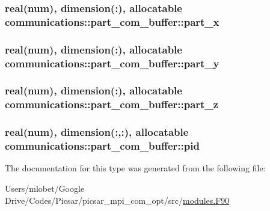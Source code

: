 \subsubsection[{\texorpdfstring{part\+\_\+x}{part_x}}]{\setlength{\rightskip}{0pt plus 5cm}real(num), dimension(\+:), allocatable communications\+::part\+\_\+com\+\_\+buffer\+::part\+\_\+x}\hypertarget{structcommunications_1_1part__com__buffer_a801190722c7c8ca2c90a9e743ea49df3}{}\label{structcommunications_1_1part__com__buffer_a801190722c7c8ca2c90a9e743ea49df3}
\subsubsection[{\texorpdfstring{part\+\_\+y}{part_y}}]{\setlength{\rightskip}{0pt plus 5cm}real(num), dimension(\+:), allocatable communications\+::part\+\_\+com\+\_\+buffer\+::part\+\_\+y}\hypertarget{structcommunications_1_1part__com__buffer_a5cd819e9ef8a6538446d32965392d7f2}{}\label{structcommunications_1_1part__com__buffer_a5cd819e9ef8a6538446d32965392d7f2}
\subsubsection[{\texorpdfstring{part\+\_\+z}{part_z}}]{\setlength{\rightskip}{0pt plus 5cm}real(num), dimension(\+:), allocatable communications\+::part\+\_\+com\+\_\+buffer\+::part\+\_\+z}\hypertarget{structcommunications_1_1part__com__buffer_aba5857af31512603eecebf3aa0203ea6}{}\label{structcommunications_1_1part__com__buffer_aba5857af31512603eecebf3aa0203ea6}
\subsubsection[{\texorpdfstring{pid}{pid}}]{\setlength{\rightskip}{0pt plus 5cm}real(num), dimension(\+:,\+:), allocatable communications\+::part\+\_\+com\+\_\+buffer\+::pid}\hypertarget{structcommunications_1_1part__com__buffer_a3f80b3e7ff7b9921254b416d8f53a70c}{}\label{structcommunications_1_1part__com__buffer_a3f80b3e7ff7b9921254b416d8f53a70c}


The documentation for this type was generated from the following file\+:\begin{DoxyCompactItemize}
\item 
Users/mlobet/\+Google Drive/\+Codes/\+Picsar/picsar\+\_\+mpi\+\_\+com\+\_\+opt/src/\hyperlink{modules_8_f90}{modules.\+F90}\end{DoxyCompactItemize}
